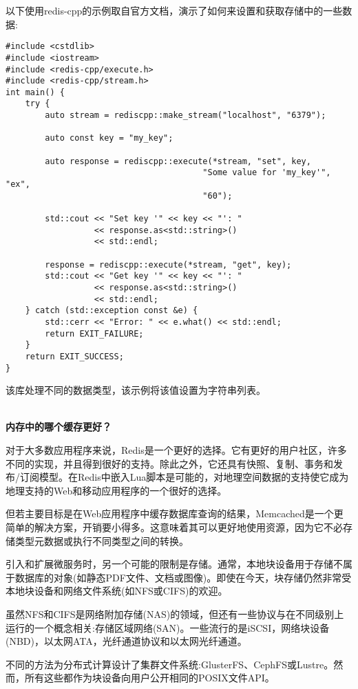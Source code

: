 以下使用redis-cpp的示例取自官方文档，演示了如何来设置和获取存储中的一些数据:

\begin{lstlisting}[style=styleCXX]
#include <cstdlib>
#include <iostream>
#include <redis-cpp/execute.h>
#include <redis-cpp/stream.h>
int main() {
	try {
		auto stream = rediscpp::make_stream("localhost", "6379");
		
		auto const key = "my_key";
		
		auto response = rediscpp::execute(*stream, "set", key,
										"Some value for 'my_key'", "ex",
										"60");
		
		std::cout << "Set key '" << key << "': "
				  << response.as<std::string>()
				  << std::endl;
		
		response = rediscpp::execute(*stream, "get", key);
		std::cout << "Get key '" << key << "': "
				  << response.as<std::string>()
				  << std::endl;
	} catch (std::exception const &e) {
		std::cerr << "Error: " << e.what() << std::endl;
		return EXIT_FAILURE;
	}
	return EXIT_SUCCESS;
}
\end{lstlisting}

该库处理不同的数据类型，该示例将该值设置为字符串列表。

\hspace*{\fill} \\ %
\noindent
\textbf{内存中的哪个缓存更好？}

对于大多数应用程序来说，Redis是一个更好的选择。它有更好的用户社区，许多不同的实现，并且得到很好的支持。除此之外，它还具有快照、复制、事务和发布/订阅模型。在Redis中嵌入Lua脚本是可能的，对地理空间数据的支持使它成为地理支持的Web和移动应用程序的一个很好的选择。

但若主要目标是在Web应用程序中缓存数据库查询的结果，Memcached是一个更简单的解决方案，开销要小得多。这意味着其可以更好地使用资源，因为它不必存储类型元数据或执行不同类型之间的转换。


引入和扩展微服务时，另一个可能的限制是存储。通常，本地块设备用于存储不属于数据库的对象(如静态PDF文件、文档或图像)。即使在今天，块存储仍然非常受本地块设备和网络文件系统(如NFS或CIFS)的欢迎。

虽然NFS和CIFS是网络附加存储(NAS)的领域，但还有一些协议与在不同级别上运行的一个概念相关:存储区域网络(SAN)。一些流行的是iSCSI，网络块设备(NBD)，以太网ATA，光纤通道协议和以太网光纤通道。

不同的方法为分布式计算设计了集群文件系统:GlusterFS、CephFS或Lustre。然而，所有这些都作为块设备向用户公开相同的POSIX文件API。

